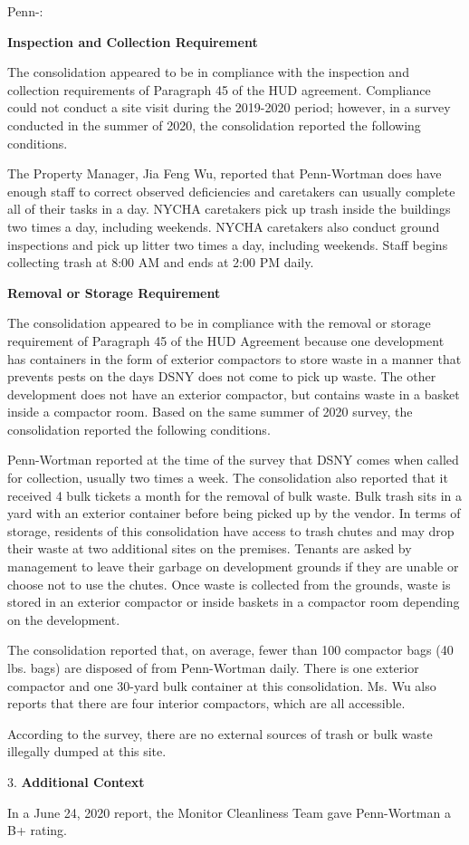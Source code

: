 Penn-:

\textbf{Inspection and Collection Requirement}

The consolidation appeared to be in compliance with the inspection and collection requirements of Paragraph 45 of the HUD agreement. Compliance could not conduct a site visit during the 2019-2020 period; however, in a survey conducted in the summer of 2020, the consolidation reported the following conditions.

The Property Manager, Jia Feng Wu, reported that Penn-Wortman does have enough staff to correct observed deficiencies and caretakers can usually complete all of their tasks in a day. NYCHA caretakers pick up trash inside the buildings two times a day, including weekends. NYCHA caretakers also conduct ground inspections and pick up litter two times a day, including weekends. Staff begins collecting trash at 8:00 AM and ends at 2:00 PM daily. 

\textbf{Removal or Storage Requirement}

The consolidation appeared to be in compliance with the  removal or storage requirement of Paragraph  45 of the HUD Agreement because one development has containers in the form of exterior compactors to store waste in a manner that prevents pests on the days DSNY does not come to pick up waste. The other development does not have an exterior compactor, but contains waste in a basket inside a compactor room. Based on the same summer of  2020 survey, the consolidation reported the following conditions.

Penn-Wortman reported at the time of the survey that DSNY comes when called for collection, usually two times a week. The consolidation also reported that it received 4 bulk tickets a month for the removal of bulk waste. Bulk trash sits in a yard with an exterior container before being picked up by the vendor. In terms of storage, residents of this consolidation have access to trash chutes and may drop their waste at two additional sites on the premises. Tenants are asked by management to leave their garbage on development grounds if they are unable or choose not to use the chutes. Once waste is collected from the grounds, waste is stored in an exterior compactor or inside baskets in a compactor room depending on the development. 

The consolidation reported that, on average, fewer than 100 compactor bags (40 lbs. bags) are disposed of from Penn-Wortman daily. There is one exterior compactor and one 30-yard bulk container at this consolidation. Ms. Wu also reports that there are four interior compactors, which are all accessible.

According to the survey, there are no external sources of trash or bulk waste illegally dumped at this site. 

3. \textbf{Additional Context} 

In a June 24, 2020 report, the Monitor Cleanliness Team gave Penn-Wortman a B+ rating. 